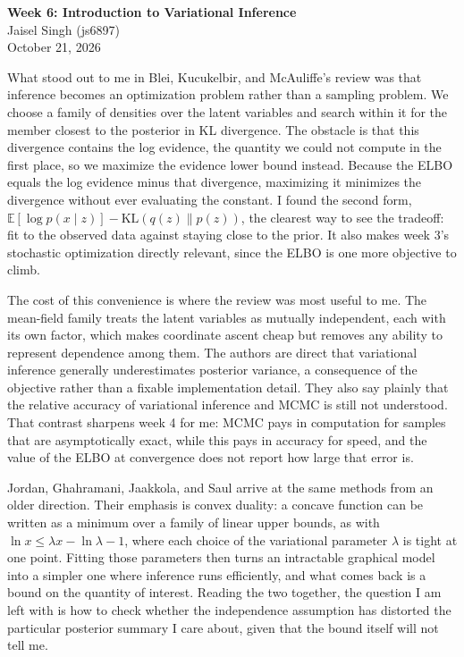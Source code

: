 \documentclass[12pt]{article}
\begin{document}
\begin{flushleft}
\textbf{Week 6: Introduction to Variational Inference} \\
Jaisel Singh (js6897) \\
October 21, 2026
\end{flushleft}

\vspace{0.1in}

What stood out to me in Blei, Kucukelbir, and McAuliffe's review was that
inference becomes an optimization problem rather than a sampling problem. We
choose a family of densities over the latent variables and search within it for the
member closest to the posterior in KL divergence. The obstacle is that
this divergence contains the log evidence, the quantity we could not compute in
the first place, so we maximize the evidence lower bound instead. Because the
ELBO equals the log evidence minus that divergence, maximizing it minimizes the
divergence without ever evaluating the constant. I found the second form,
\mbox{$\mathbb{E}[\log p(x \mid z)] - \mathrm{KL}(q(z) \| p(z))$}, the clearest
way to see the tradeoff: fit to the observed data against staying close to the
prior. It also makes week 3's stochastic optimization directly relevant, since the
ELBO is one more objective to climb.

The cost of this convenience is where the review was most useful to me. The
mean-field family treats the latent variables as mutually independent, each with
its own factor, which makes coordinate ascent cheap but removes any ability to
represent dependence among them. The authors are direct that variational
inference generally underestimates posterior variance, a consequence of the
objective rather than a fixable implementation detail. They also say
plainly that the relative accuracy of variational inference and MCMC is still not
understood. That contrast sharpens week 4 for me: MCMC pays in computation for
samples that are asymptotically exact, while this pays in accuracy for speed, and
the value of the ELBO at convergence does not report how large that error is.

Jordan, Ghahramani, Jaakkola, and Saul arrive at the same methods from an older
direction. Their emphasis is convex duality: a concave function can be written as
a minimum over a family of linear upper bounds, as with
\mbox{$\ln x \le \lambda x - \ln \lambda - 1$}, where each choice of the
variational parameter $\lambda$ is tight at one point. Fitting those parameters
then turns an intractable graphical model into a simpler one where inference runs
efficiently, and what comes back is a bound on the quantity of interest. Reading
the two together, the question I am left with is how to check whether the
independence assumption has distorted the particular posterior summary I care
about, given that the bound itself will not tell me.
\end{document}
